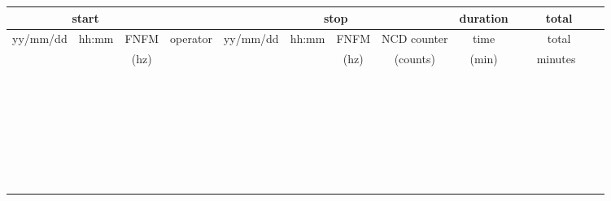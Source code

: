 \begin{center}
\begin{tabular}{|c|c|c|c|c|c|c|c|c|c|}
\hline
\multicolumn{3}{|c|}{start} &      &\multicolumn{4}{|c|}{stop} & duration & total\\
\hline
yy/mm/dd & hh:mm & FNFM & operator  & yy/mm/dd & hh:mm & FNFM & NCD counter   &time &total\\
         &       & (hz) &           &         &       & (hz) & (counts) & (min)    &~~~minutes~~~~\\
\hline
  &  &  &  & & & & & &\\
\hline
  &  &  &  & & & & & &\\
\hline
  &  &  &  & & & & & &\\
\hline
  &  &  &  & & & & & &\\
\hline
  &  &  &  & & & & & &\\
\hline
  &  &  &  & & & & & &\\
\hline
  &  &  &  & & & & & &\\
\hline
  &  &  &  & & & & & &\\
\hline
  &  &  &  & & & & & &\\
\hline
  &  &  &  & & & & & &\\
\hline
  &  &  &  & & & & & &\\
\hline
  &  &  &  & & & & & &\\
\hline
  &  &  &  & & & & & &\\
\hline
  &  &  &  & & & & & &\\
\hline
  &  &  &  & & & & & &\\
\hline
  &  &  &  & & & & & &\\
\hline
  &  &  &  & & & & & &\\
\hline
  &  &  &  & & & & & &\\
\hline
  &  &  &  & & & & & &\\
\hline
  &  &  &  & & & & & &\\
\hline
  &  &  &  & & & & & &\\
\hline
  &  &  &  & & & & & &\\
\hline
  &  &  &  & & & & & &\\
\hline
  &  &  &  & & & & & &\\
\hline
  &  &  &  & & & & & &\\
\hline
  &  &  &  & & & & & &\\
\hline
  &  &  &  & & & & & &\\
\hline
  &  &  &  & & & & & &\\
\hline
  &  &  &  & & & & & &\\

\end{tabular}
\end{center}

